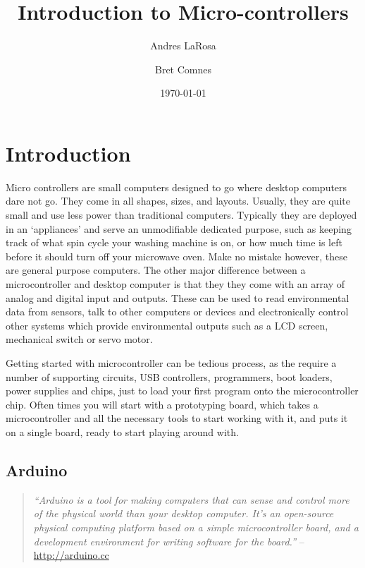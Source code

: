 \documentclass[11pt,a4paper]{article}
\begin{document}
\title{Introduction to Micro-controllers}
\date{\today} 
\author{Andres LaRosa}
\author{Bret Comnes}
\maketitle

\section{Introduction} %
\label{sec:introduction}

Micro controllers are small computers designed to go where desktop computers dare not go.  They come in all shapes, sizes, and layouts.  Usually, they are quite small and use less power than traditional computers.  Typically they are deployed in an `appliances' and serve an unmodifiable dedicated purpose, such as keeping track of what spin cycle your washing machine is on, or how much time is left before it should turn off your microwave oven.  Make no mistake however, these are general purpose computers.  The other major difference between a microcontroller and desktop computer is that they they come with an array of analog and digital input and outputs. These can be used to read environmental data from sensors, talk to other computers or devices and electronically control other systems which provide environmental outputs such as a LCD screen, mechanical switch or servo motor.  \cite{wpmicro}

Getting started with microcontroller can be tedious process, as the require a number of supporting circuits, USB controllers, programmers, boot loaders, power supplies and chips, just to load your first program onto the microcontroller chip.  Often times you will start with a prototyping board, which takes a microcontroller and all the necessary tools to start working with it, and puts it on a single board, ready to start playing around with.

\subsection{Arduino} %
\label{sub:arduino}

\begin{quote}
\emph{``Arduino is a tool for making computers that can sense and control more of the physical world than your desktop computer. It's an open-source physical computing platform based on a simple microcontroller board, and a development environment for writing software for the board.''} -- \url{http://arduino.cc}
\end{quote}
\end{document}
